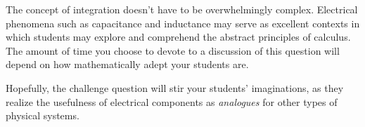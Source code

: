 





The concept of integration doesn't have to be overwhelmingly complex.  Electrical phenomena such as capacitance and inductance may serve as excellent contexts in which students may explore and comprehend the abstract principles of calculus.  The amount of time you choose to devote to a discussion of this question will depend on how mathematically adept your students are.

Hopefully, the challenge question will stir your students' imaginations, as they realize the usefulness of electrical components as {\it analogues} for other types of physical systems.





